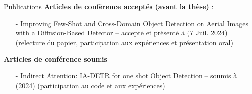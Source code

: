 \begin{subsectionframemod}{Publications}
    \textbf{Articles de conférence acceptés (avant la thèse)} :
    \begin{itemize}
        \item[-] Improving Few-Shot and Cross-Domain Object Detection on Aerial Images with a Diffusion-Based Detector --
        accepté et présenté à  (7 Juil. 2024) (relecture du papier, participation aux expériences et présentation oral)
    \end{itemize}

    \textbf{Articles de conférence soumis}
    \begin{itemize}
        \item[-] Indirect Attention: IA-DETR for one shot Object Detection -- soumis à  (2024) (participation au code et aux expériences)
    \end{itemize}

\end{subsectionframemod}

